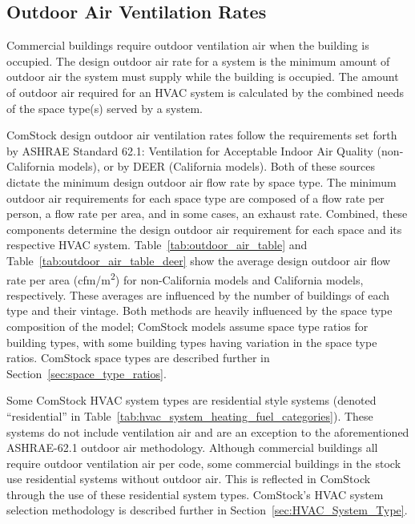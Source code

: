 \subsection{Outdoor Air Ventilation Rates}

Commercial buildings require outdoor ventilation air when the building is occupied. The design outdoor air rate for a system is the minimum amount of outdoor air the system must supply while the building is occupied. The amount of outdoor air required for an HVAC system is calculated by the combined needs of the space type(s) served by a system.

ComStock design outdoor air ventilation rates follow the requirements set forth by ASHRAE Standard 62.1: Ventilation for Acceptable Indoor Air Quality (non-California models), or by DEER (California models). Both of these sources dictate the minimum design outdoor air flow rate by space type. The minimum outdoor air requirements for each space type are composed of a flow rate per person, a flow rate per area, and in some cases, an exhaust rate. Combined, these components determine the design outdoor air requirement for each space and its respective HVAC system. Table~\ref{tab:outdoor_air_table} and Table~\ref{tab:outdoor_air_table_deer} show the average design outdoor air flow rate per area (cfm/m\textsuperscript{2}) for non-California models and California models, respectively. These averages are influenced by the number of buildings of each type and their vintage. Both methods are heavily influenced by the space type composition of the model; ComStock models assume space type ratios for building types, with some building types having variation in the space type ratios. ComStock space types are described further in Section~\ref{sec:space_type_ratios}.

Some ComStock HVAC system types are residential style systems (denoted ``residential'' in Table~\ref{tab:hvac_system_heating_fuel_categories}). These systems do not include ventilation air and are an exception to the aforementioned ASHRAE-62.1 outdoor air methodology. Although commercial buildings all require outdoor ventilation air per code, some commercial buildings in the stock use residential systems without outdoor air. This is reflected in ComStock through the use of these residential system types. ComStock's HVAC system selection methodology is described further in Section~\ref{sec:HVAC_System_Type}.




